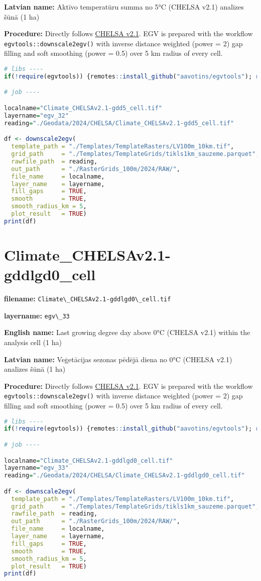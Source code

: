 \documentclass[
]{book}
\newcommand{\passthrough}[1]{#1}
\begin{document}
\textbf{Latvian name:} Aktīvo temperatūru summa no 5°C (CHELSA v2.1) analīzes šūnā (1 ha)

\textbf{Procedure:} Directly follows \hyperref[Ch04.11]{CHELSA v2.1}. EGV is prepared with the
workflow \passthrough{\lstinline!egvtools::downscale2egv()!} with inverse distance weighted (power = 2)
gap filling and soft smoothing (power = 0.5) over 5 km radius of every cell.

\begin{lstlisting}[language=R]
# libs ----
if(!require(egvtools)) {remotes::install_github("aavotins/egvtools"); require(egvtools)}

# job ----

localname="Climate_CHELSAv2.1-gdd5_cell.tif"
layername="egv_32"
reading="./Geodata/2024/CHELSA/Climate_CHELSAv2.1-gdd5_cell.tif"

df <- downscale2egv(
  template_path = "./Templates/TemplateRasters/LV100m_10km.tif",
  grid_path     = "./Templates/TemplateGrids/tikls1km_sauzeme.parquet",
  rawfile_path  = reading,
  out_path      = "./RasterGrids_100m/2024/RAW/",
  file_name     = localname,
  layer_name    = layername,
  fill_gaps     = TRUE,
  smooth        = TRUE,
  smooth_radius_km = 5,
  plot_result   = TRUE)
print(df)
\end{lstlisting}

\section{Climate\_CHELSAv2.1-gddlgd0\_cell}\label{ch06.033}

\textbf{filename:} \passthrough{\lstinline!Climate\_CHELSAv2.1-gddlgd0\_cell.tif!}

\textbf{layername:} \passthrough{\lstinline!egv\_33!}

\textbf{English name:} Last growing degree day above 0°C (CHELSA v2.1) within the analysis cell (1 ha)

\textbf{Latvian name:} Veģetācijas sezonas pēdējā diena no 0°C (CHELSA v2.1) analīzes šūnā (1 ha)

\textbf{Procedure:} Directly follows \hyperref[Ch04.11]{CHELSA v2.1}. EGV is prepared with the
workflow \passthrough{\lstinline!egvtools::downscale2egv()!} with inverse distance weighted (power = 2)
gap filling and soft smoothing (power = 0.5) over 5 km radius of every cell.

\begin{lstlisting}[language=R]
# libs ----
if(!require(egvtools)) {remotes::install_github("aavotins/egvtools"); require(egvtools)}

# job ----

localname="Climate_CHELSAv2.1-gddlgd0_cell.tif"
layername="egv_33"
reading="./Geodata/2024/CHELSA/Climate_CHELSAv2.1-gddlgd0_cell.tif"

df <- downscale2egv(
  template_path = "./Templates/TemplateRasters/LV100m_10km.tif",
  grid_path     = "./Templates/TemplateGrids/tikls1km_sauzeme.parquet",
  rawfile_path  = reading,
  out_path      = "./RasterGrids_100m/2024/RAW/",
  file_name     = localname,
  layer_name    = layername,
  fill_gaps     = TRUE,
  smooth        = TRUE,
  smooth_radius_km = 5,
  plot_result   = TRUE)
print(df)
\end{lstlisting}
\end{document}
